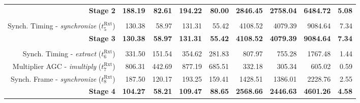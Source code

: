 \begin{table}[htp]
{{\begin{tabular}{r | r r r r  | r r r | r}
                 \textbf{Stage 2}                                             &  \textbf{188.19} &    \textbf{82.61} &   \textbf{194.22} &                          \textbf{80.00} &  \textbf{2846.45} &  \textbf{2758.04} &  \textbf{6484.72} & \textbf{5.08}  \\ %
                                                                              &                  &                   &                   &                                         &                   &                   &                   &                \\
                   Synch. Timing  -  \emph{synchronize} ($t^\text{Rxt}_{5}$)  &          130.38  &            58.97  &           131.31  &                                  55.42  &          4108.52  &          4079.39  &          9084.64  &          7.34  \\ \hline
                 \textbf{Stage 3}                                             &  \textbf{130.38} &    \textbf{58.97} &   \textbf{131.31} &                          \textbf{55.42} &  \textbf{4108.52} &  \textbf{4079.39} &  \textbf{9084.64} &  \textbf{7.34} \\ %
                                                                              &                  &                   &                   &                                         &                   &                   &                   &                \\
                    Synch. Timing -      \emph{extract} ($t^\text{Rxt}_{6}$)  &          331.50  &           151.54  &           354.62  &                                 281.83  &           807.97  &           755.28  &          1767.48  &          1.44  \\
                   Multiplier AGC -    \emph{imultiply} ($t^\text{Rxt}_{7}$)  &          806.31  &           442.69  &           877.19  &                                 685.51  &           332.18  &           305.34  &           605.02  &          0.59  \\
                     Synch. Frame -  \emph{synchronize} ($t^\text{Rxt}_{8}$)  &          187.50  &           120.17  &           193.25  &                                 159.41  &          1428.51  &          1386.01  &          2228.76  &          2.55  \\ \hline
                 \textbf{Stage 4}                                             &  \textbf{104.27} &    \textbf{58.21} &   \textbf{109.47} &                          \textbf{88.65} &  \textbf{2568.66} &  \textbf{2446.63} &  \textbf{4601.26} &  \textbf{4.58} \\ %

\end{tabular}}}
\end{table}
